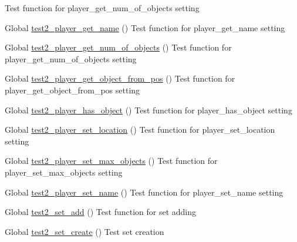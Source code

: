\begin{DoxyRefList}
%
Test function for player\+\_\+get\+\_\+num\+\_\+of\+\_\+objects setting  
\item[Global \mbox{\hyperlink{player__test_8c_a3aa908fd360b74e7786422260e8e16a0}{test2\+\_\+player\+\_\+get\+\_\+name}} ()]\label{test__test000141}%
%
Test function for player\+\_\+get\+\_\+name setting  
\item[Global \mbox{\hyperlink{player__test_8c_a01d69adc313b04afef1cf4b9505bed13}{test2\+\_\+player\+\_\+get\+\_\+num\+\_\+of\+\_\+objects}} ()]\label{test__test000155}%
%
Test function for player\+\_\+get\+\_\+num\+\_\+of\+\_\+objects setting  
\item[Global \mbox{\hyperlink{player__test_8c_a5431c585848f01642f2d10dc6a7eede2}{test2\+\_\+player\+\_\+get\+\_\+object\+\_\+from\+\_\+pos}} ()]\label{test__test000151}%
%
Test function for player\+\_\+get\+\_\+object\+\_\+from\+\_\+pos setting  
\item[Global \mbox{\hyperlink{player__test_8c_ae8953d45d8f555a930dbc8aba101d399}{test2\+\_\+player\+\_\+has\+\_\+object}} ()]\label{test__test000153}%
%
Test function for player\+\_\+has\+\_\+object setting  
\item[Global \mbox{\hyperlink{player__test_8c_a2c702753d9e2e3df9ef4abf2d1b9bc8d}{test2\+\_\+player\+\_\+set\+\_\+location}} ()]\label{test__test000143}%
%
Test function for player\+\_\+set\+\_\+location setting  
\item[Global \mbox{\hyperlink{player__test_8c_ae1ed9bdcf1037c295a64cc780cb81dbc}{test2\+\_\+player\+\_\+set\+\_\+max\+\_\+objects}} ()]\label{test__test000157}%
%
Test function for player\+\_\+set\+\_\+max\+\_\+objects setting  
\item[Global \mbox{\hyperlink{player__test_8c_a6e7ce8ff791f4bf63749df647a44263f}{test2\+\_\+player\+\_\+set\+\_\+name}} ()]\label{test__test000139}%
%
Test function for player\+\_\+set\+\_\+name setting  
\item[Global \mbox{\hyperlink{set__test_8c_ab09827322a313bf97b9757c98c2bdbb0}{test2\+\_\+set\+\_\+add}} ()]\label{test__test000170}%
%
Test function for set adding  
\item[Global \mbox{\hyperlink{set__test_8c_abed3d273788e23fc31ae7f5ed59277b9}{test2\+\_\+set\+\_\+create}} ()]\label{test__test000162}%
%
Test set creation  

\end{DoxyRefList}
